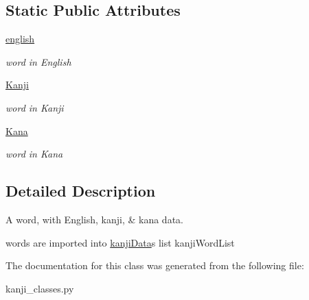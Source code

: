 \subsection*{Static Public Attributes}
\begin{DoxyCompactItemize}
\item 
\mbox{\label{classkanji__classes_1_1word_a3672a193ed62fe6b259d36a2ed901b18}} 
\mbox{\hyperlink{classkanji__classes_1_1word_a3672a193ed62fe6b259d36a2ed901b18}{english}}
\begin{DoxyCompactList}\small\item\em word in English \end{DoxyCompactList}\item 
\mbox{\label{classkanji__classes_1_1word_a987f93c54c3dcb7517ecb7b44a7b3900}} 
\mbox{\hyperlink{classkanji__classes_1_1word_a987f93c54c3dcb7517ecb7b44a7b3900}{Kanji}}
\begin{DoxyCompactList}\small\item\em word in Kanji \end{DoxyCompactList}\item 
\mbox{\label{classkanji__classes_1_1word_a85bd7cfc84d7c2d7a288acf203708fa2}} 
\mbox{\hyperlink{classkanji__classes_1_1word_a85bd7cfc84d7c2d7a288acf203708fa2}{Kana}}
\begin{DoxyCompactList}\small\item\em word in Kana \end{DoxyCompactList}\end{DoxyCompactItemize}


\subsection{Detailed Description}
A word, with English, kanji, \& kana data. 

words are imported into \mbox{\hyperlink{classkanji__classes_1_1kanji_data}{kanji\+Data}}\textquotesingle{}s list kanji\+Word\+List 

The documentation for this class was generated from the following file\+:\begin{DoxyCompactItemize}
\item 
kanji\+\_\+classes.\+py\end{DoxyCompactItemize}

